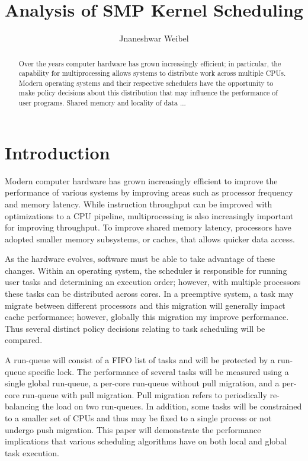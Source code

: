 \documentclass[11pt, twocolumn]{proc}
\title{Analysis of SMP Kernel Scheduling}
\author{Jnaneshwar Weibel}
\begin{document}

\maketitle

\begin{abstract}
Over the years computer hardware has grown increasingly efficient; in particular, the capability for multiprocessing allows systems to distribute work across multiple CPUs.  Modern operating systems and their respective schedulers have the opportunity to make policy decisions about this distribution that may influence the performance of user programs.  Shared memory and locality of data ...
\end{abstract}



\section{Introduction}
\label{sec:introduction}
Modern computer hardware has grown increasingly efficient to improve the performance of various systems by improving areas such as processor frequency and memory latency.   While instruction throughput can be improved with optimizations to a CPU pipeline, multiprocessing is also increasingly important for improving throughput.  To improve shared memory latency, processors have adopted smaller memory subsystems, or caches, that allows quicker data access.

As the hardware evolves, software must be able to take advantage of these changes.  Within an operating system, the scheduler is responsible for running user tasks and determining an execution order; however, with multiple processors these tasks can be distributed across cores.  In a preemptive system, a task may migrate between different processors and this migration will generally impact cache performance; however, globally this migration my improve performance.  Thus several distinct policy decisions relating to task scheduling will be compared.

A run-queue will consist of a FIFO list of tasks and will be protected by a run-queue specific lock.  The performance of several tasks will be measured using a single global run-queue, a per-core run-queue without pull migration, and a per-core run-queue with pull migration.  Pull migration refers to periodically re-balancing the load on two run-queues.  In addition, some tasks will be constrained to a smaller set of CPUs and thus may be fixed to a single process or not undergo push migration.  This paper will demonstrate the performance implications that various scheduling algorithms have on both local and global task execution.
\end{document}

